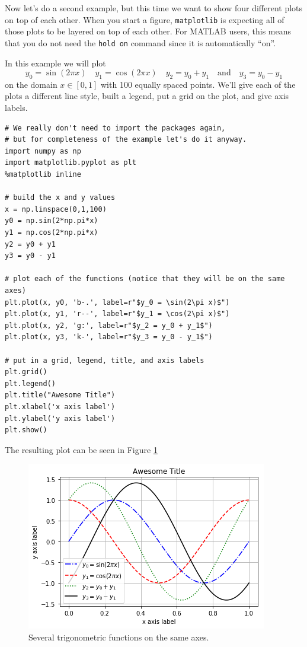 \begin{example}
    Now let's do a second example, but this time we want to show four different plots on
    top of each other.  When you start a figure, \texttt{matplotlib} is expecting all of
    those plots to be layered on top of each other.  For MATLAB users, this means that you
    do not need the \texttt{hold on} command since it is automatically ``on''.  

In this example we will plot
$$y_0 = \sin(2\pi x) \quad y_1 = \cos(2 \pi x) \quad y_2 = y_0 + y_1 \quad \text{and} \quad y_3 = y_0 - y_1$$
on the domain $x \in [0,1]$ with 100 equally spaced points.  We'll give each of the plots a different line style, built a legend, put a grid on the plot, and give axis labels.

\bcode
\begin{lstlisting}
# We really don't need to import the packages again, 
# but for completeness of the example let's do it anyway.
import numpy as np
import matplotlib.pyplot as plt
%matplotlib inline

# build the x and y values
x = np.linspace(0,1,100)
y0 = np.sin(2*np.pi*x)
y1 = np.cos(2*np.pi*x)
y2 = y0 + y1
y3 = y0 - y1

# plot each of the functions (notice that they will be on the same axes)
plt.plot(x, y0, 'b-.', label=r"$y_0 = \sin(2\pi x)$")
plt.plot(x, y1, 'r--', label=r"$y_1 = \cos(2\pi x)$")
plt.plot(x, y2, 'g:', label=r"$y_2 = y_0 + y_1$")
plt.plot(x, y3, 'k-', label=r"$y_3 = y_0 - y_1$")

# put in a grid, legend, title, and axis labels
plt.grid()
plt.legend()
plt.title("Awesome Title")
plt.xlabel('x axis label')
plt.ylabel('y axis label')
plt.show()
\end{lstlisting}
The resulting plot can be seen in Figure \ref{fig:matplotlib_2}
\end{example}


\begin{figure}[ht!]
    \centering
    \includegraphics[width=0.7\columnwidth]{Images/matplotlib_2.png}
    \caption{Several trigonometric functions on the same axes.}
    \label{fig:matplotlib_2}
\end{figure}

